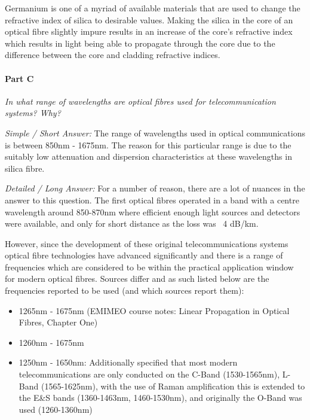 \documentclass[colorlinks,11pt,a4paper,normalphoto,withhyper,ragged2e]{altareport}
\begin{document}
Germanium is one of a myriad of available materials that are used to change the refractive index of silica to desirable values. Making the silica in the core of an optical fibre slightly impure results in an increase of the core's refractive index which results in light being able to propagate through the core due to the difference between the core and cladding refractive indices.




\paragraph{Part C \linebreak}
\textit{In what range of wavelengths are optical fibres used for telecommunication systems? Why?} \linebreak

\emph{Simple / Short Answer:} \linebreak
The range of wavelengths used in optical communications is between 850nm - 1675nm. The reason for this particular range is due to the suitably low attenuation and dispersion characteristics at these wavelengths in silica fibre. \linebreak

\emph{Detailed / Long Answer:} \linebreak
For a number of reason, there are a lot of nuances in the answer to this question. The first optical fibres operated in a band with a centre wavelength around 850-870nm \cite{fund_of_photonics}\cite{adv_fiber_optics} where efficient enough light sources and detectors were available, and only for short distance as the loss was ~4 dB/km. \cite{adv_fiber_optics} \linebreak

\newpage

However, since the development of these original telecommunications systems optical fibre technologies have advanced significantly and there is a range of frequencies which are considered to be within the practical application window for modern optical fibres. Sources differ and as such listed below are the frequencies reported to be used (and which sources report them):

\smallskip

\begin{itemize}[leftmargin=1cm]
	\item 1265nm - 1675nm (EMIMEO course notes: Linear Propagation in Optical Fibres, Chapter One)
	\item 1260nm - 1675nm \cite{fund_of_photonics}
	\item 1250nm - 1650nm: Additionally specified that most modern telecommunications are only conducted on the C-Band (1530-1565nm), L-Band (1565-1625nm), with the use of Raman amplification this is extended to the E\&S bands (1360-1463nm, 1460-1530nm), and originally the O-Band was used (1260-1360nm) \cite{adv_fiber_optics}
\end{itemize}
\end{document}
